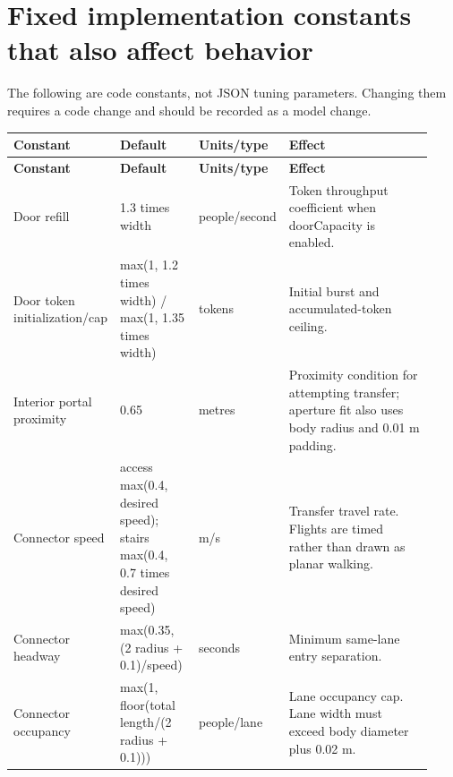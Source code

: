 \documentclass[11pt]{article}
\begin{document}
\section{Fixed implementation constants that also affect behavior}

The following are code constants, not JSON tuning parameters. Changing them requires a code change and should be recorded as a model change.


{\small\setlength{\tabcolsep}{4pt}

\begin{longtable}{@{}p{0.23\linewidth}p{0.19\linewidth}p{0.13\linewidth}p{0.38\linewidth}@{}}

\toprule

\textbf{Constant} & \textbf{Default} & \textbf{Units/type} & \textbf{Effect} \\

\midrule\endfirsthead

\toprule

\textbf{Constant} & \textbf{Default} & \textbf{Units/type} & \textbf{Effect} \\

\midrule\endhead

\bottomrule\endfoot

Door refill & 1.3 times width & people/second & Token throughput coefficient when doorCapacity is enabled. \\

Door token initialization/cap & max(1, 1.2 times width) / max(1, 1.35 times width) & tokens & Initial burst and accumulated-token ceiling. \\

Interior portal proximity & 0.65 & metres & Proximity condition for attempting transfer; aperture fit also uses body radius and 0.01 m padding. \\

Connector speed & access max(0.4, desired speed); stairs max(0.4, 0.7 times desired speed) & m/s & Transfer travel rate. Flights are timed rather than drawn as planar walking. \\

Connector headway & max(0.35, (2 radius + 0.1)/speed) & seconds & Minimum same-lane entry separation. \\

Connector occupancy & max(1, floor(total length/(2 radius + 0.1))) & people/lane & Lane occupancy cap. Lane width must exceed body diameter plus 0.02 m. \\


\end{longtable}}
\end{document}
